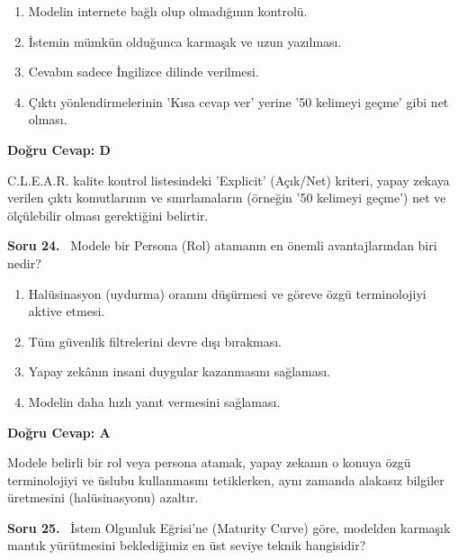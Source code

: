\documentclass[11pt,a4paper,openany]{book}
\begin{document}
\begin{enumerate}[label=\Alph*), leftmargin=25pt, topsep=4pt, itemsep=2pt]
        \item Modelin internete bağlı olup olmadığının kontrolü.
        \item İstemin mümkün olduğunca karmaşık ve uzun yazılması.
        \item Cevabın sadece İngilizce dilinde verilmesi.
        \item Çıktı yönlendirmelerinin 'Kısa cevap ver' yerine '50 kelimeyi geçme' gibi net olması.
\end{enumerate}

\vspace{4pt}
\begin{tcolorbox}[title=Cevap ve Açıklama, colback=gray!3!white, colframe=primarycolor!90!black, arc=2mm, fonttitle=\bfseries\sffamily, top=6pt, bottom=6pt]
    \textbf{Doğru Cevap: D}

    \vspace{2pt}
    C.L.E.A.R. kalite kontrol listesindeki 'Explicit' (Açık/Net) kriteri, yapay zekaya verilen çıktı komutlarının ve sınırlamaların (örneğin '50 kelimeyi geçme') net ve ölçülebilir olması gerektiğini belirtir.
\end{tcolorbox}
\vspace{10pt}
\needspace{5cm}
\vspace{8pt}
\noindent\textbf{\large\sffamily Soru 24.} \ Modele bir Persona (Rol) atamanın en önemli avantajlarından biri nedir?

\begin{enumerate}[label=\Alph*), leftmargin=25pt, topsep=4pt, itemsep=2pt]
        \item Halüsinasyon (uydurma) oranını düşürmesi ve göreve özgü terminolojiyi aktive etmesi.
        \item Tüm güvenlik filtrelerini devre dışı bırakması.
        \item Yapay zekânın insani duygular kazanmasını sağlaması.
        \item Modelin daha hızlı yanıt vermesini sağlaması.
\end{enumerate}

\vspace{4pt}
\begin{tcolorbox}[title=Cevap ve Açıklama, colback=gray!3!white, colframe=primarycolor!90!black, arc=2mm, fonttitle=\bfseries\sffamily, top=6pt, bottom=6pt]
    \textbf{Doğru Cevap: A}

    \vspace{2pt}
    Modele belirli bir rol veya persona atamak, yapay zekanın o konuya özgü terminolojiyi ve üslubu kullanmasını tetiklerken, aynı zamanda alakasız bilgiler üretmesini (halüsinasyonu) azaltır.
\end{tcolorbox}
\vspace{10pt}
\needspace{5cm}
\vspace{8pt}
\noindent\textbf{\large\sffamily Soru 25.} \ İstem Olgunluk Eğrisi'ne (Maturity Curve) göre, modelden karmaşık mantık yürütmesini beklediğimiz en üst seviye teknik hangisidir?
\end{document}
